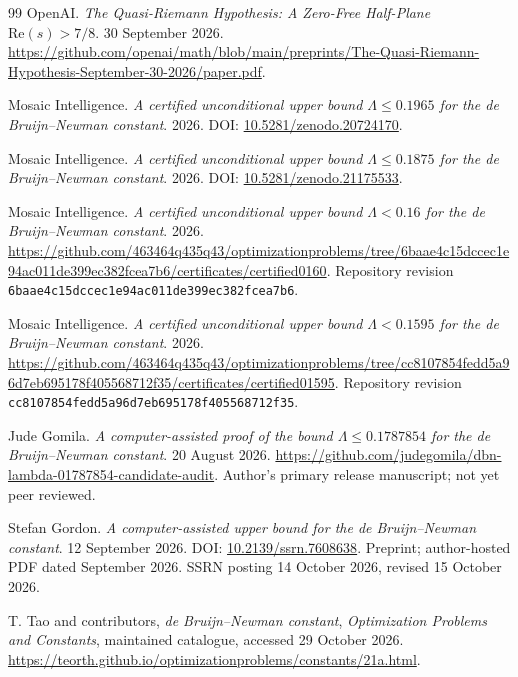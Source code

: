 \documentclass[11pt,a4paper]{article}
\theoremstyle{definition}
\theoremstyle{remark}
\begin{document}
\begin{thebibliography}{99}
OpenAI. \emph{The Quasi-Riemann Hypothesis: A Zero-Free Half-Plane $\mathrm{Re}(s)>7/8$}.
30 September 2026.
\url{https://github.com/openai/math/blob/main/preprints/The-Quasi-Riemann-Hypothesis-September-30-2026/paper.pdf}.

Mosaic Intelligence. \emph{A certified unconditional upper bound $\Lambda\leq0.1965$ for the de Bruijn--Newman constant}.
2026.
DOI: \href{https://doi.org/10.5281/zenodo.20724170}{10.5281/zenodo.20724170}.

Mosaic Intelligence. \emph{A certified unconditional upper bound $\Lambda\leq0.1875$ for the de Bruijn--Newman constant}.
2026.
DOI: \href{https://doi.org/10.5281/zenodo.21175533}{10.5281/zenodo.21175533}.

Mosaic Intelligence. \emph{A certified unconditional upper bound $\Lambda<0.16$ for the de Bruijn--Newman constant}.
2026.
\url{https://github.com/463464q435q43/optimizationproblems/tree/6baae4c15dccec1e94ac011de399ec382fcea7b6/certificates/certified0160}.
Repository revision \texttt{6baae4c15dccec1e94ac011de399ec382fcea7b6}.

Mosaic Intelligence. \emph{A certified unconditional upper bound $\Lambda<0.1595$ for the de Bruijn--Newman constant}.
2026.
\url{https://github.com/463464q435q43/optimizationproblems/tree/cc8107854fedd5a96d7eb695178f405568712f35/certificates/certified01595}.
Repository revision \texttt{cc8107854fedd5a96d7eb695178f405568712f35}.

Jude Gomila. \emph{A computer-assisted proof of the bound $\Lambda\leq0.1787854$ for the de Bruijn--Newman constant}.
20 August 2026.
\url{https://github.com/judegomila/dbn-lambda-01787854-candidate-audit}.
Author's primary release manuscript; not yet peer reviewed.

Stefan Gordon. \emph{A computer-assisted upper bound for the de Bruijn--Newman constant}.
12 September 2026.
DOI: \href{https://doi.org/10.2139/ssrn.7608638}{10.2139/ssrn.7608638}.
Preprint; author-hosted PDF dated September 2026. SSRN posting 14 October 2026, revised 15 October 2026.

T. Tao and contributors, \emph{de Bruijn--Newman constant},
\emph{Optimization Problems and Constants}, maintained catalogue,
accessed 29 October 2026.
\url{https://teorth.github.io/optimizationproblems/constants/21a.html}.
\end{thebibliography}
\end{document}
